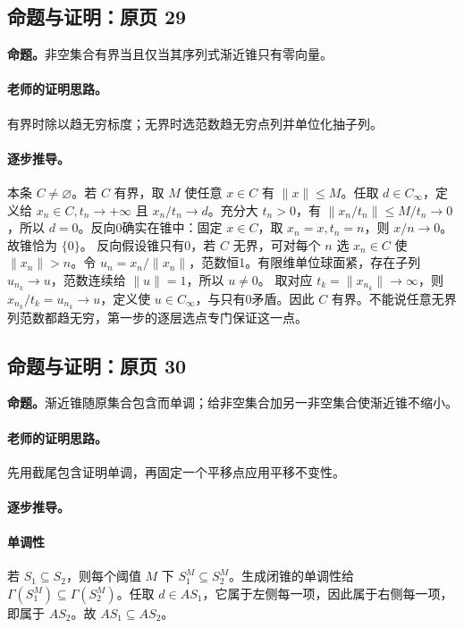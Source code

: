 \documentclass[11pt,a4paper]{article}
\theoremstyle{definition}\newtheorem{definition}{定义}\newtheorem{example}{例}
\begin{document}
\subsection{命题与证明：原页 29}

\textbf{命题。}非空集合有界当且仅当其序列式渐近锥只有零向量。

\paragraph{老师的证明思路。}有界时除以趋无穷标度；无界时选范数趋无穷点列并单位化抽子列。

\paragraph{逐步推导。}
本条 $C\ne\varnothing$。若 $C$ 有界，取 $M$ 使任意 $x\in C$ 有 $\|x\|\le M$。任取 $d\in C_\infty$，定义给 $x_n\in C,t_n\to+\infty$ 且 $x_n/t_n\to d$。充分大 $t_n>0$，有 $\|x_n/t_n\|\le M/t_n\to0$，所以 $d=0$。反向0确实在锥中：固定 $x\in C$，取 $x_n=x,t_n=n$，则 $x/n\to0$。故锥恰为 $\{0\}$。
反向假设锥只有0，若 $C$ 无界，可对每个 $n$ 选 $x_n\in C$ 使 $\|x_n\|>n$。令 $u_n=x_n/\|x_n\|$，范数恒1。有限维单位球面紧，存在子列 $u_{n_k}\to u$，范数连续给 $\|u\|=1$，所以 $u\ne0$。
取对应 $t_k=\|x_{n_k}\|\to\infty$，则 $x_{n_k}/t_k=u_{n_k}\to u$，定义使 $u\in C_\infty$，与只有0矛盾。因此 $C$ 有界。不能说任意无界列范数都趋无穷，第一步的逐层选点专门保证这一点。


\subsection{命题与证明：原页 30}

\textbf{命题。}渐近锥随原集合包含而单调；给非空集合加另一非空集合使渐近锥不缩小。

\paragraph{老师的证明思路。}先用截尾包含证明单调，再固定一个平移点应用平移不变性。

\paragraph{逐步推导。}
\paragraph{单调性}若 $S_1\subseteq S_2$，则每个阈值 $M$ 下 $S_1^M\subseteq S_2^M$。生成闭锥的单调性给 $\Gamma(S_1^M)\subseteq\Gamma(S_2^M)$。任取 $d\in AS_1$，它属于左侧每一项，因此属于右侧每一项，即属于 $AS_2$。故 $AS_1\subseteq AS_2$。
\end{document}
